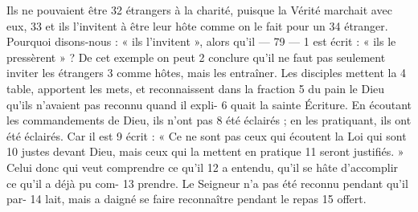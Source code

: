 Ils ne pouvaient être	 
32	 	étrangers à la charité, puisque la Vérité marchait avec eux,	 
33	 	et ils l'invitent à être leur hôte comme on le fait pour un	 
34	 	étranger. Pourquoi disons-nous : « ils l'invitent », alors qu'il	 
 	--- 79 ---	 
1	 	est écrit : « ils le pressèrent » ? De cet exemple on peut	 
2	 	conclure qu'il ne faut pas seulement inviter les étrangers	 
3	 	comme hôtes, mais les entraîner. Les disciples mettent la	 
4	 	table, apportent les mets, et reconnaissent dans la fraction	 
5	 	du pain le Dieu qu'ils n'avaient pas reconnu quand il expli-	 
6	 	quait la sainte Écriture.
En écoutant les commandements de Dieu, ils n'ont pas	 
8	 	été éclairés ; en les pratiquant, ils ont été éclairés. Car il est	 
9	 	écrit : « Ce ne sont pas ceux qui écoutent la Loi qui sont	 
10	 	justes devant Dieu, mais ceux qui la mettent en pratique	 
11	 	seront justifiés. » Celui donc qui veut comprendre ce qu'il	 
12	 	a entendu, qu'il se hâte d'accomplir ce qu'il a déjà pu com-	 
13	 	prendre. Le Seigneur n'a pas été reconnu pendant qu'il par-	 
14	 	lait, mais a daigné se faire reconnaître pendant le repas	 
15	 	offert.